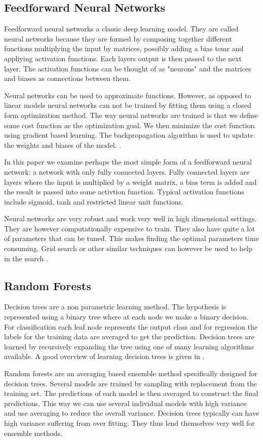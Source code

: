 
\subsection{Feedforward Neural Networks}
Feedforward neural networks a classic deep learning model. They are called neural networks because they are formed by composing together different functions multiplying the input by matrices, possibly adding a bias temr and appliying activation functions. Each layers output is then passed to the next layer. The activation functions can be thought of as "neurons" and the matrices and biases as connections between them.

Neural networks can be used to approximate functions. However, as opposed to linear models neural networks can not be trained by fitting them using a closed form optimization method. The way neural networks are trained is that we define some cost function as the optimization goal. We then minimize the cost function using gradient based learning. The backpropagation algorithm is used to update the weights and biases of the model. \cite{deep-learning-book}.

In this paper we examine perhaps the most simple form of a feedforward neural network: a network with only fully connected layers. Fully connected layers are layers where the input is multiplied by a weight matrix, a bias term is added and the result is passed into some activtion function. Typical activation functions include sigmoid, tanh and restricted linear unit functions.

Neural networks are very robust and work very well in high dimensional settings. They are however computationally expensive to train. They also have quite a lot of parameters that can be tuned. This makes finding the optimal parameters time consuming. Grid search or other similar techniques can however be used to help in the search \cite{deep-learning-book}.

\subsection{Random Forests}

Decision trees are a non parametric learning method. The hypothesis is represented using a binary tree where at each node we make a binary decision. For classification each leaf node represents the output class and for regression the labels for the training data are averaged to get the prediction. Decision trees are learned by recursively expanding the tree using one of many learning algorithms available. A good overview of learning decision trees is given in \cite{alpaydin}.

Random forests are an averaging based ensemble method specifically designed for decision trees. \cite{sklearn} Several models are trained by sampling with replacement from the training set. The predictions of each model is then averaged to construct the final predictions. This way we can use several individual models with high variance and use averaging to reduce the overall variance. Decision trees typically can have high variance suffering from over fitting. They thus lend themselves very well for ensemble methods.


